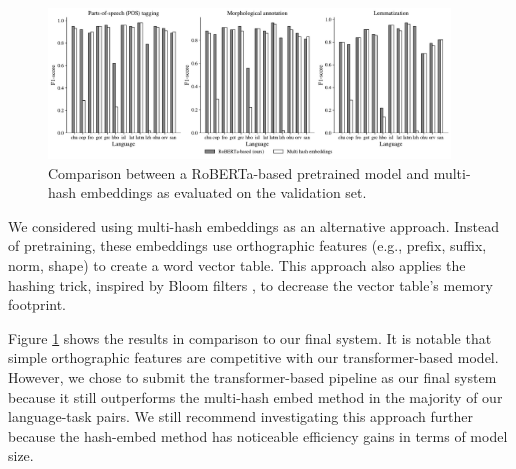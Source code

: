 \documentclass[11pt]{article}
\begin{document}
\begin{figure}[t]
  \centering
  \includegraphics[width=0.95\textwidth]{figures/hashembed.pdf}
  \caption{Comparison between a RoBERTa-based pretrained model and multi-hash embeddings \cite{miranda-etal-2022-multi} as evaluated on the validation set.}
  \label{fig:hashembed}
\end{figure}

We considered using multi-hash embeddings \cite{miranda-etal-2022-multi} as an alternative approach.
Instead of pretraining, these embeddings use orthographic features (e.g., prefix, suffix, norm, shape) to create a word vector table.
This approach also applies the hashing trick, inspired by Bloom filters \cite{bloom-1970-space}, to decrease the vector table's memory footprint.

Figure \ref{fig:hashembed} shows the results in comparison to our final system.
It is notable that simple orthographic features are competitive with our transformer-based model.
However, we chose to submit the transformer-based pipeline as our final system because it still outperforms the multi-hash embed method in the majority of our language-task pairs.
We still recommend investigating this approach further because the hash-embed method has noticeable efficiency gains in terms of model size.
\end{document}
